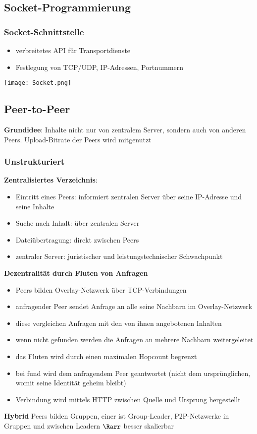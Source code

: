	\subsection{Socket-Programmierung}
		\subsubsection{Socket-Schnittstelle}
			\begin{itemize}
				\item verbreitetes API für Transportdienste
				\item Festlegung von TCP/UDP, IP-Adressen, Portnummern
			\end{itemize}
			\begin{center}
				\texttt{[image: Socket.png]}
			\end{center}
	\subsection{Peer-to-Peer}
		\textbf{Grundidee}: Inhalte nicht nur von zentralem Server, sondern auch von anderen Peers. Upload-Bitrate der Peers wird mitgenutzt
		\subsubsection{Unstrukturiert}
			\textbf{Zentralisiertes Verzeichnis}:
			\begin{itemize}
				\item Eintritt eines Peers: informiert zentralen Server über seine IP-Adresse und seine Inhalte
				\item Suche nach Inhalt: über zentralen Server
				\item Dateiübertragung: direkt zwischen Peers
				\item zentraler Server: juristischer und leistungstechnischer Schwachpunkt
			\end{itemize}
			\textbf{Dezentralität durch Fluten von Anfragen}
			\begin{itemize}
				\item Peers bilden Overlay-Netzwerk über TCP-Verbindungen
				\item anfragender Peer sendet Anfrage an alle seine Nachbarn im Overlay-Netzwerk
				\item diese vergleichen Anfragen mit den von ihnen angebotenen Inhalten
				\item wenn nicht gefunden werden die Anfragen an mehrere Nachbarn weitergeleitet
				\item das Fluten wird durch einen maximalen Hopcount begrenzt
				\item bei fund wird dem anfragendem Peer geantwortet (nicht dem ursprünglichen, womit seine Identität geheim bleibt)
				\item Verbindung wird mittels HTTP zwischen Quelle und Ursprung hergestellt
			\end{itemize}
			\textbf{Hybrid} \newline \newline
				Peers bilden Gruppen, einer ist Group-Leader, P2P-Netzwerke in Gruppen und zwischen Leadern $\Rarr$ besser skalierbar
